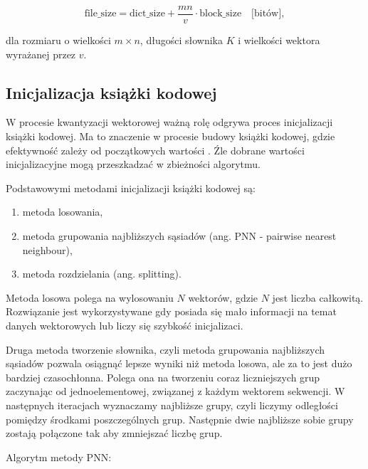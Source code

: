 \documentclass{article}
\begin{document}
\begin{equation}
  \textrm{file\_size} = \textrm{dict\_size} + \frac{mn}{v} \cdot \textrm{block\_size}  \quad  \textrm{[bitów]},
  \label{eq:mrvq_image_size}
\end{equation}

dla rozmiaru o wielkości $m \times n$, długości słownika $K$ i wielkości wektora wyrażanej przez $v$.

\subsection{Inicjalizacja książki kodowej}

W procesie kwantyzacji wektorowej ważną rolę odgrywa proces inicjalizacji książki kodowej.
Ma to znaczenie w procesie budowy książki kodowej, gdzie efektywność zależy od początkowych wartości \cite{arthur2006k}.
Źle dobrane wartości inicjalizacyjne mogą przeszkadzać w zbieżności algorytmu.

Podstawowymi metodami inicjalizacji książki kodowej są:

\begin{enumerate}
  \item metoda losowania,
  \item metoda grupowania najbliższych sąsiadów (ang. PNN - pairwise nearest neighbour),
  \item metoda rozdzielania (ang. splitting).
\end{enumerate}

Metoda losowa polega na wylosowaniu $N$ wektorów, gdzie $N$ jest liczba całkowitą.
Rozwiązanie jest wykorzystywane gdy posiada się mało informacji na temat danych wektorowych lub liczy się
szybkość inicjalizaci.

Druga metoda tworzenie słownika, czyli metoda grupowania najbliższych sąsiadów pozwala osiągnąć lepsze wyniki niż metoda losowa,
ale za to jest dużo bardziej czasochłonna.
Polega ona na tworzeniu coraz liczniejszych grup zaczynając od jednoelementowej, związanej z każdym wektorem sekwencji.
W następnych iteracjach wyznaczamy najbliższe grupy, czyli liczymy odległości pomiędzy środkami poszczególnych grup.
Następnie dwie najbliższe sobie grupy zostają połączone tak aby zmniejszać liczbę grup.

Algorytm metody PNN:
\end{document}
